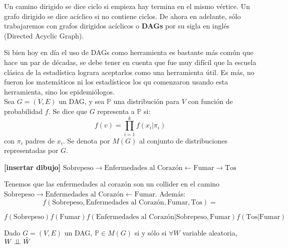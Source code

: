 Un camino dirigido se dice ciclo si empieza hay termina en el mismo vértice. Un grafo dirigido se dice acíclico si no contiene ciclos. De ahora en adelante, sólo trabajaremos con grafos dirigidos acíclicos o \textbf{DAGs} por su sigla en inglés (Directed Acyclic Graph).  

Si bien hoy en día el uso de DAGs como herramienta es bastante más común que hace un par de décadas, se debe tener en cuenta que fue muy difícil que la escuela clásica de la estadística lograra aceptarlos como una herramienta útil. Es más, no fueron los matemáticos ni los estadísticos los qu comenzaron usando esta herramienta, sino los epidemiólogos.  \\

 Sea $G=(V,E)$ un DAG, y sea $\mathbb{P}$ una distribución para $V$ con función de probabilidad $f$. Se dice que $G$ representa a $\mathbb{P}$ si: 
$$
f(v)=\prod_{i=1}^{k} f(x_i|\pi_i) 
$$
con $\pi_i$ padres de $x_i$. Se denota por $M(G)$ al conjunto de distribuciones representadas por $G$. 

\example \textbf{[insertar dibujo]} $\text{Sobrepeso} \rightarrow \text{Enfermedades al Corazón} \leftarrow \text{Fumar} \rightarrow \text{Tos} $

Tenemos que las enfermedades al corazón son un collider en el camino $ \text{Sobrepeso} \rightarrow \text{Enfermedades al Corazón} \leftarrow \text{Fumar}$. Además: 
$$
f(\text{Sobrepeso},\text{Enfermedades al Corazón}, \text{Fumar},\text{Tos})= 
$$

$$
f(\text{Sobrepeso}) f(\text{Fumar}) f(\text{Enfermedades al Corazón}|\text{Sobrepeso},\text{Fumar}) f(\text{Tos}|\text{Fumar}) 
$$

\theorem Dado $G=(V,E)$ un DAG, $\mathbb{P} \in M(G)$ si y sólo si $\forall W $ variable aleatoria, $W \perp \!\!\! \perp \tilde{W}$